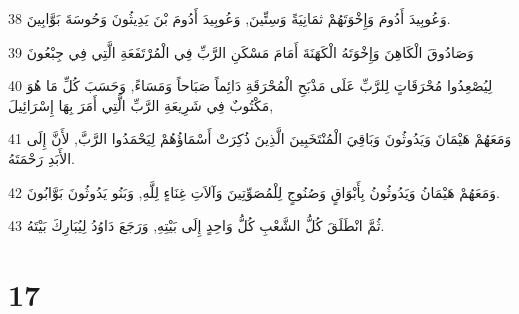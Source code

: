 \par 38 وَعُوبِيدَ أَدُومَ وَإِخْوَتَهُمْ ثمَانِيَةً وَسِتِّينَ, وَعُوبِيدَ أَدُومَ بْنَ يَدِيثُونَ وَحُوسَةَ بَوَّابِينَ.
\par 39 وَصَادُوقَ الْكَاهِنَ وَإِخْوَتَهُ الْكَهَنَةَ أَمَامَ مَسْكَنِ الرَّبِّ فِي الْمُرْتَفَعَةِ الَّتِي فِي جِبْعُونَ
\par 40 لِيُصْعِدُوا مُحْرَقَاتٍ لِلرَّبِّ عَلَى مَذْبَحِ الْمُحْرَقَةِ دَائِماً صَبَاحاً وَمَسَاءً, وَحَسَبَ كُلِّ مَا هُوَ مَكْتُوبٌ فِي شَرِيعَةِ الرَّبِّ الَّتِي أَمَرَ بِهَا إِسْرَائِيلَ,
\par 41 وَمَعَهُمْ هَيْمَانَ وَيَدُوثُونَ وَبَاقِيَ الْمُنْتَخَبِينَ الَّذِينَ ذُكِرَتْ أَسْمَاؤُهُمْ لِيَحْمَدُوا الرَّبَّ, لأَنَّ إِلَى الأَبَدِ رَحْمَتَهُ.
\par 42 وَمَعَهُمْ هَيْمَانُ وَيَدُوثُونُ بِأَبْوَاقٍ وَصُنُوجٍ لِلْمُصَوِّتِينَ وَآلاَتِ غِنَاءٍ لِلَّهِ, وَبَنُو يَدُوثُونَ بَوَّابُونَ.
\par 43 ثُمَّ انْطَلَقَ كُلُّ الشَّعْبِ كُلُّ وَاحِدٍ إِلَى بَيْتِهِ, وَرَجَعَ دَاوُدُ لِيُبَارِكَ بَيْتَهُ.

\chapter{17}

